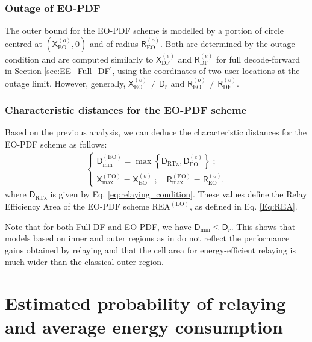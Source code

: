 \documentclass[journal]{IEEEtran}
\theoremstyle{definition}
\begin{document}
\subsubsection{Outage of EO-PDF}

The outer bound for the EO-PDF scheme is modelled by a portion of circle centred at $(\mathsf{X}_{\text{EO}}^{(o)},0)$ and of radius $\mathsf{R}_{\text{EO}}^{(o)}$. Both are determined by the outage condition and are computed similarly to $\mathsf{X}_{\text{DF}}^{(e)}$ and $\mathsf{R}_{\text{DF}}^{(e)}$ for full decode-forward in Section \ref{sec:EE_Full_DF}, using the coordinates of two user locations at the outage limit. However, generally, $\mathsf{X}_{\text{EO}}^{(o)} \neq \mathsf{D}_r$ and $\mathsf{R}_{\text{EO}}^{(o)} \neq \mathsf{R}_{\text{DF}}^{(o)}$.

\subsubsection{Characteristic distances for the EO-PDF scheme}

Based on the previous analysis, we can deduce the characteristic distances for the EO-PDF scheme as follows:
\begin{align}
\left\lbrace \begin{array}{l}
\mathsf{D}_{\min}^{(\text{EO})} =\max \left\{ \mathsf{D}_{\text{RTx}}, \mathsf{D}_{\text{EO}}^{(e)} \right \} \; ; \\
\mathsf{X}_{\max}^{(\text{EO})} = \mathsf{X}_{\text{EO}}^{(o)} \; ; \quad
\mathsf{R}_{\max}^{(\text{EO})} = \mathsf{R}_{\text{EO}}^{(o)} .
\end{array}
\right. 
\end{align}
where $\mathsf{D}_{\text{RTx}}$ is given by Eq. \eqref{eq:relaying_condition}. These values define the Relay Efficiency Area of the EO-PDF scheme $\text{REA}^{(\text{EO})}$, as defined in Eq. \eqref{Eq:REA}.

Note that for both Full-DF and EO-PDF, we have
$\mathsf{D}_{\min} \leq \mathsf{D}_r$. This shows that models based on inner and outer regions as in \cite{Chandwani2010}
do not reflect the performance gains obtained by relaying and that the cell area for energy-efficient relaying is much wider than the classical outer region.



\section{Estimated probability of relaying and average energy consumption}
\label{sec:P_RTx_energy}
\end{document}
